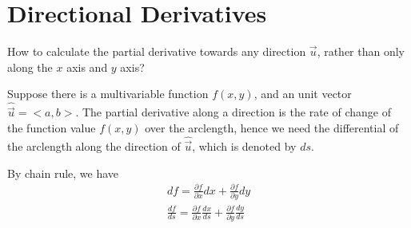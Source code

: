 \documentclass{article}
\begin{document}
\section{Directional Derivatives}

How to calculate the partial derivative towards any direction $\vec{u}$, rather 
than only along the $x$ axis and $y$ axis?

Suppose there is a multivariable function $f(x, y)$, and an unit vector 
$\hat{\vec{u}} = <a, b>$. The partial derivative along a direction is the rate 
of change of the function value $f(x, y)$ over the arclength, hence we need the 
differential of the arclength along the direction of $\hat{\vec{u}}$, which is 
denoted by $ds$. 

By chain rule, we have
\begin{gather*}
  df = \frac{\partial f}{\partial x}dx + \frac{\partial f}{\partial y}dy \\
  \frac{df}{ds} = \frac{\partial f}{\partial x}\frac{dx}{ds} + \frac{\partial f}{\partial y}\frac{dy}{ds} \\
\end{gather*}
\end{document}
